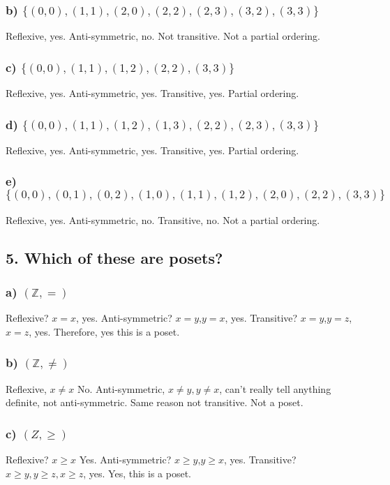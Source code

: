 \documentclass[11pt, oneside]{article} %
\numberwithin{equation}{section} %
\numberwithin{figure}{section} %
\numberwithin{table}{section} %
\begin{document}
\subsubsection{b) $\{(0, 0), (1, 1), (2, 0), (2, 2), (2, 3), (3, 2), (3, 3)\}$}
Reflexive, yes. Anti-symmetric, no. Not transitive. Not a partial ordering.
\subsubsection{c) $\{(0, 0), (1, 1), (1, 2), (2, 2), (3, 3)\}$}
Reflexive, yes. Anti-symmetric, yes. Transitive, yes. Partial ordering.
\subsubsection{d) $\{(0, 0), (1, 1), (1, 2), (1, 3), (2, 2), (2, 3), (3, 3)\}$}
Reflexive, yes. Anti-symmetric, yes. Transitive, yes. Partial ordering.
\subsubsection{e) $\{(0,0),(0,1),(0,2),(1,0),(1,1),(1,2),(2,0), (2, 2), (3, 3)\}$}
Reflexive, yes. Anti-symmetric, no. Transitive, no. Not a partial ordering.



\subsection{5. Which of these are posets?}
\subsubsection{a) $(\mathbb{Z},=)$}
Reflexive? $x=x$, yes. Anti-symmetric? $x=y$,$y=x$, yes. Transitive? $x=y$,$y=z$,$x=z$, yes. Therefore, yes this is a poset.
\subsubsection{b) $(\mathbb{Z},\ne )$}
Reflexive, $x \ne x $ No. Anti-symmetric, $x \ne y, y \ne x$, can't really tell anything definite, not anti-symmetric. Same reason not transitive. Not a poset.
\subsubsection{c) $(Z,\geq)$}
Reflexive? $x \geq x$ Yes. Anti-symmetric? $x \geq y$,$y \geq x$, yes. Transitive? $x \geq y, y \geq z, x \geq z$, yes. Yes, this is a poset.
\end{document}
